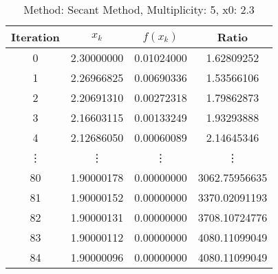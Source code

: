\begin{table}
\centering
\caption{Method: Secant Method, Multiplicity: 5, x0: 2.3}
\label{tab:table_Secant_Method_5_2_3}
\begin{tabular}{c c c c}
\toprule
Iteration &      $x_k$ &   $f(x_k)$ &         Ratio \\
\midrule
        0 & 2.30000000 & 0.01024000 &    1.62809252 \\
        1 & 2.26966825 & 0.00690336 &    1.53566106 \\
        2 & 2.20691310 & 0.00272318 &    1.79862873 \\
        3 & 2.16603115 & 0.00133249 &    1.93293888 \\
        4 & 2.12686050 & 0.00060089 &    2.14645346 \\
   \vdots &     \vdots &     \vdots &        \vdots \\
       80 & 1.90000178 & 0.00000000 & 3062.75956635 \\
       81 & 1.90000152 & 0.00000000 & 3370.02091193 \\
       82 & 1.90000131 & 0.00000000 & 3708.10724776 \\
       83 & 1.90000112 & 0.00000000 & 4080.11099049 \\
       84 & 1.90000096 & 0.00000000 & 4080.11099049 \\
\bottomrule
\end{tabular}
\end{table}
